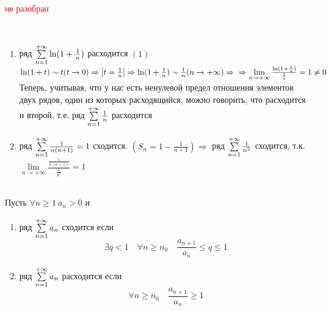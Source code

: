 \textcolor{red}{не разобран}
\begin{Example}~
	\begin{enumerate}
		\item ряд $\sum\limits_{n = 1}^{+\infty}{\ln(1+\frac{1}{n})}$ расходится $(1)$ \\
			$\ln(1+t) \sim t (t \to 0) \Rightarrow [t=\frac{1}{n}] \Rightarrow \ln(1+\frac{1}{n}) \sim \frac{1}{n} (n \to +\infty) \Rightarrow\\
			\Rightarrow \lim\limits_{n \to +\infty} \frac{\ln(1+\frac{1}{n})}{\frac{1}{n}} = 1 \neq 0$ \\
			Теперь, учитывая, что у нас есть ненулевой предел отношения элементов двух рядов, один из которых расходящийся, можно говорить, что расходится и второй, т.е. ряд $\sum\limits_{n = 1}^{+\infty}{\frac{1}{n}}$ расходится
		\item ряд $\sum\limits_{n = 1}^{+\infty}{\frac{1}{n(n+1)}} = 1$ сходится. $(S_n = 1 - \frac{1}{n+1}) \Rightarrow$ ряд $\sum\limits_{n = 1}^{+\infty}{\frac{1}{n^2}}$ сходится, т.к. $\lim\limits_{n \to +\infty}\frac{\frac{1}{n(n+1)}}{\frac{1}{n^2}} = 1$
	\end{enumerate}
\end{Example}

\begin{Th}~\\
	Пусть $\forall n \geq 1 \: a_n > 0$ и
	\begin{enumerate}
		\item ряд $\sum\limits_{n = 1}^{+\infty}{a_n}$ сходится если
        \[
            \exists q < 1 \quad \forall n \geqslant n_0 \quad \frac{a_{n+1}}{a_n} \leqslant q \leqslant 1
        \]
		
        \item ряд $\sum\limits_{n = 1}^{+\infty}{a_n}$ расходится если 
        \[
            \forall n \geqslant n_0 \quad \frac{a_{n+1}}{a_n} \geqslant 1
        \] 
	\end{enumerate}
\end{Th}

